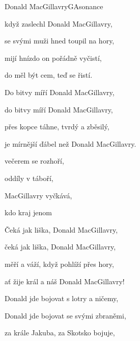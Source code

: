\setcounter{page}{22}
\begin{song}{Donald MacGillavry}{G}{Asonance}

\begin{SBVerse}

 když zaslechl Donald MacGillavry,

se svými muži hned toupil na hory,

mijí hnízdo on pořádně vyčistí,

do měl být cem, teď  se řistí.

\end{SBVerse}

\begin{SBVerse}

Do bitvy míří Donald MacGillavry,

do bitvy míří Donald MacGillavry,

přes kopce táhne, tvrdý a zběsilý,

je mírnější ďábel než Donald MacGillavry.

\end{SBVerse}

\begin{SBChorus}

 večerem  se rozhoří,

 oddíly v  táboří,

 MacGillavry  vyčkává,

 kdo kraj  jenom  

\end{SBChorus}

\begin{SBVerse}

Čeká jak liška, Donald MacGillavry,

čeká jak liška, Donald MacGillavry,

měří a váží, když pohlíží přes hory,

ať žije král a náš Donald MacGillavry!

\end{SBVerse}

\begin{SBChorus}

Donald jde bojovat s lotry a ničemy,

Donald jde bojovat se svými zbraněmi,

za krále Jakuba, za Skotsko bojuje,


\end{SBChorus}
\end{song}
